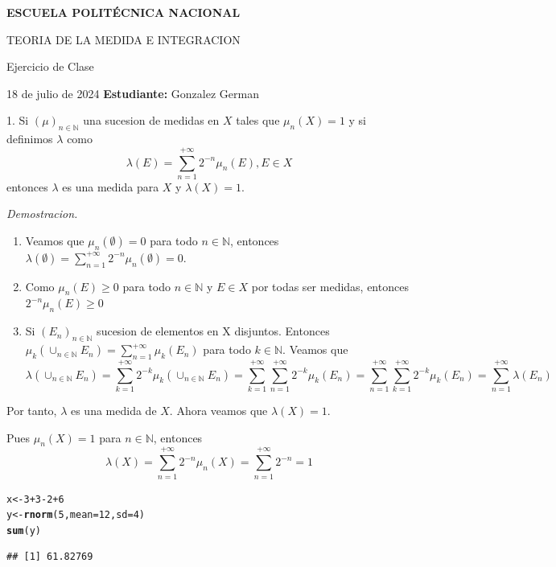 \documentclass{article}\usepackage[]{graphicx}\usepackage[]{xcolor}
\makeatletter
\newcommand{\hlnum}[1]{\textcolor[rgb]{0.686,0.059,0.569}{#1}}%
\newcommand{\hlopt}[1]{\textcolor[rgb]{0,0,0}{#1}}%
\newcommand{\hldef}[1]{\textcolor[rgb]{0.345,0.345,0.345}{#1}}%
\newcommand{\hlkwb}[1]{\textcolor[rgb]{0.69,0.353,0.396}{#1}}%
\newcommand{\hlkwc}[1]{\textcolor[rgb]{0.333,0.667,0.333}{#1}}%
\newcommand{\hlkwd}[1]{\textcolor[rgb]{0.737,0.353,0.396}{\textbf{#1}}}%
\newenvironment{kframe}{%
 \def\at@end@of@kframe{}%
 \ifinner\ifhmode%
  \def\at@end@of@kframe{\end{minipage}}%
  \begin{minipage}{\columnwidth}%
 \fi\fi%
 \def\FrameCommand##1{\hskip\@totalleftmargin \hskip-\fboxsep
 \colorbox{shadecolor}{##1}\hskip-\fboxsep
     \hskip-\linewidth \hskip-\@totalleftmargin \hskip\columnwidth}%
 \MakeFramed {\advance\hsize-\width
   \@totalleftmargin\z@ \linewidth\hsize
   \@setminipage}}%
 {\par\unskip\endMakeFramed%
 \at@end@of@kframe}
\newenvironment{knitrout}{}{} %
\makeatother
\begin{document}
\hrulefill

\begin{center}
\textbf{ESCUELA POLITÉCNICA NACIONAL}

TEORIA DE LA MEDIDA E INTEGRACION
\end{center}
\begin{center}
    Ejercicio de Clase
\end{center}

18 de julio de 2024 \hfill \textbf{Estudiante:} Gonzalez German

\hrulefill

1. Si $(\mu)_{n \in \mathbb{N}}$ una sucesion de medidas en $X$ tales que $\mu_n(X)=1$ y si definimos $\lambda$ como $$\lambda(E)=\sum_{n=1}^{+\infty} 2^{-n} \mu_{n}(E) , E \in X$$
entonces $\lambda$ es una medida para $X$ y $\lambda(X)=1$.

\textit{Demostracion.} 
\begin{enumerate}
    \item Veamos que $\mu_n(\emptyset)=0$ para todo $n \in \mathbb{N}$, entonces $\lambda(\emptyset)=\sum_{n=1}^{+\infty} 2^{-n} \mu_{n}(\emptyset)=0$.
    \item Como $\mu_n(E) \geq 0$ para todo $n \in \mathbb{N}$ y $E \in X$ por todas ser medidas, entonces $2^{-n} \mu_n(E) \geq 0$
    \item Si $(E_n)_{n \in \mathbb{N}}$ sucesion de elementos en X disjuntos. Entonces $\mu_k (\cup_{n \in \mathbb{N}} E_n) = \sum_{n=1}^{+\infty} \mu_k (E_n)$ para todo $k\in \mathbb{N}$.
    Veamos que $$\lambda(\cup_{n \in \mathbb{N}} E_n)= \sum_{k=1}^{+\infty} 2^{-k} \mu_k (\cup_{n \in \mathbb{N}} E_n)=\sum_{k=1}^{+\infty} \sum_{n=1}^{+\infty} 2^{-k} \mu_k (E_n)=\sum_{n=1}^{+\infty} \sum_{k=1}^{+\infty}  2^{-k} \mu_k (E_n)= \sum_{n=1}^{+\infty} \lambda(E_n)$$
    
\end{enumerate}

Por tanto, $\lambda$ es una medida de $X$. Ahora veamos que $\lambda(X)=1$.

Pues $\mu_n(X)=1$ para $n\in \mathbb{N}$, entonces $$\lambda(X)=\sum_{n=1}^{+\infty} 2^{-n} \mu_n(X)= \sum_{n=1}^{+\infty} 2^{-n} =1$$ 

\begin{knitrout}
\color{fgcolor}\begin{kframe}
\begin{alltt}
\hldef{x} \hlkwb{<-} \hlnum{3}\hlopt{+}\hlnum{3}\hlopt{-}\hlnum{2}\hlopt{+}\hlnum{6}
\hldef{y} \hlkwb{<-} \hlkwd{rnorm}\hldef{(}\hlnum{5}\hldef{,}\hlkwc{mean}\hldef{=}\hlnum{12}\hldef{,}\hlkwc{sd}\hldef{=}\hlnum{4}\hldef{)}
\hlkwd{sum}\hldef{(y)}
\end{alltt}
\begin{verbatim}
## [1] 61.82769
\end{verbatim}
\end{kframe}
\end{knitrout}
\end{document}
